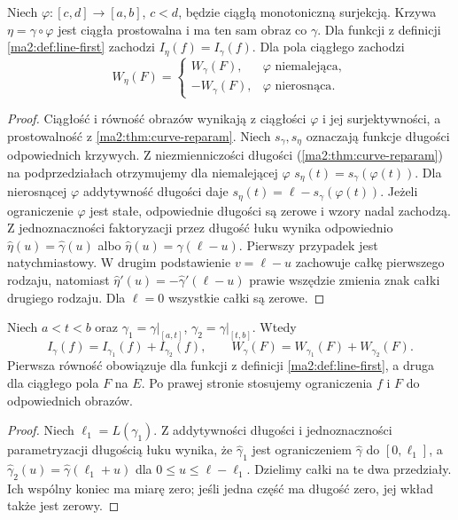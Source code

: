 \begin{twierdzenie}
\label{ma2:thm:line-orientation}
Niech $\varphi:[c,d]\to[a,b]$, $c<d$,
będzie ciągłą monotoniczną surjekcją.
Krzywa $\eta=\gamma\circ\varphi$ jest ciągła
prostowalna i ma ten sam obraz co $\gamma$.
Dla funkcji z definicji \ref{ma2:def:line-first}
zachodzi $I_\eta(f)=I_\gamma(f)$.
Dla pola ciągłego zachodzi
\[
 W_\eta(F)=
 \begin{cases}
 W_\gamma(F),&\varphi\text{ niemalejąca},\\
 -W_\gamma(F),&\varphi\text{ nierosnąca}.
 \end{cases}
\]
\end{twierdzenie}
\begin{proof}
Ciągłość i równość obrazów wynikają z ciągłości
$\varphi$ i jej surjektywności, a prostowalność
z \ref{ma2:thm:curve-reparam}.
Niech $s_\gamma,s_\eta$ oznaczają funkcje
długości odpowiednich krzywych.
Z niezmienniczości długości
(\ref{ma2:thm:curve-reparam}) na podprzedziałach
otrzymujemy dla niemalejącej $\varphi$
$s_\eta(t)=s_\gamma(\varphi(t))$.
Dla nierosnącej $\varphi$ addytywność długości
daje $s_\eta(t)=\ell-s_\gamma(\varphi(t))$.
Jeżeli ograniczenie $\varphi$ jest stałe,
odpowiednie długości są zerowe i wzory
nadal zachodzą.
Z jednoznaczności faktoryzacji przez długość
łuku wynika odpowiednio
$\widehat\eta(u)=\widehat\gamma(u)$ albo
$\widehat\eta(u)=\widehat\gamma(\ell-u)$.
Pierwszy przypadek jest natychmiastowy.
W drugim podstawienie $v=\ell-u$ zachowuje
całkę pierwszego rodzaju, natomiast
$\widehat\eta'(u)=-\widehat\gamma'(\ell-u)$
prawie wszędzie zmienia znak całki
drugiego rodzaju.
Dla $\ell=0$ wszystkie całki są zerowe.
\end{proof}

\begin{stwierdzenie}[Addytywność]
\label{ma2:prop:line-additivity}
Niech $a<t<b$ oraz
$\gamma_1=\gamma|_{[a,t]}$,
$\gamma_2=\gamma|_{[t,b]}$.
Wtedy
\[
 I_\gamma(f)=I_{\gamma_1}(f)+I_{\gamma_2}(f),
 \qquad
 W_\gamma(F)=W_{\gamma_1}(F)+W_{\gamma_2}(F).
\]
Pierwsza równość obowiązuje dla funkcji
z definicji \ref{ma2:def:line-first}, a druga
dla ciągłego pola $F$ na $E$. Po prawej stronie
stosujemy ograniczenia $f$ i $F$ do odpowiednich
obrazów.
\end{stwierdzenie}
\begin{proof}
Niech $\ell_1=L(\gamma_1)$.
Z addytywności długości i jednoznaczności
parametryzacji długością łuku
wynika, że $\widehat\gamma_1$ jest
ograniczeniem $\widehat\gamma$ do $[0,\ell_1]$,
a $\widehat\gamma_2(u)=\widehat\gamma(\ell_1+u)$
dla $0\le u\le\ell-\ell_1$.
Dzielimy całki na te dwa przedziały.
Ich wspólny koniec ma miarę zero;
jeśli jedna część ma długość zero,
jej wkład także jest zerowy.
\end{proof}

